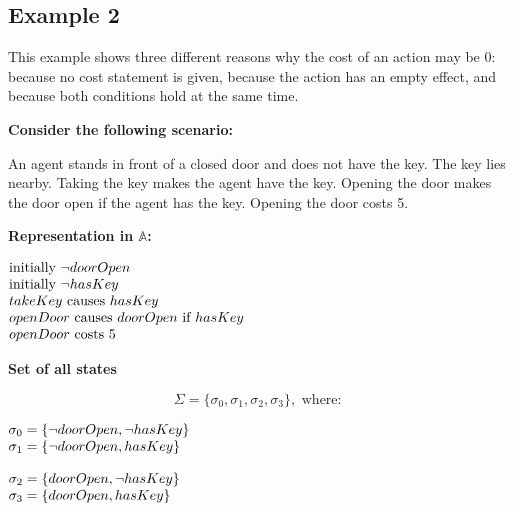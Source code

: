 \documentclass[11pt]{article}
\makeatletter
\newcommand{\states}{\Sigma}
\newcommand{\scenarioheader}{\par\noindent\textbf{Consider the following scenario:}\par}
\newcommand{\repheader}{\par\noindent\textbf{Representation in \(\mathbb{A}\):}\par}
\newcommand{\exampleblocktitle}[1]{\par\medskip\noindent\textbf{#1}\par\smallskip}
\newenvironment{centeredleftblock}[1][0.78\textwidth]
{\begin{center}\begin{minipage}{#1}\raggedright}
{\end{minipage}\end{center}}
\newenvironment{statementblock}
{\begin{flushleft}\renewcommand{\arraystretch}{1.1}\(\begin{array}{@{}l@{}}}
{\end{array}\)\end{flushleft}}
\makeatother
\begin{document}
\subsection*{Example 2}
This example shows three different reasons why the cost of an action may be
\(0\): because no cost statement is given, because the action has an empty
effect, and because both conditions hold at the same time.

\scenarioheader
An agent stands in front of a closed door and does not have the key. The key
lies nearby. Taking the key makes the agent have the key. Opening the door
makes the door open if the agent has the key. Opening the door costs 5.
\repheader
\begin{centeredleftblock}[0.62\textwidth]
\begin{statementblock}
\text{initially}~ \neg doorOpen \\
\text{initially}~ \neg hasKey \\
takeKey ~\text{causes}~ hasKey \\
openDoor ~\text{causes}~ doorOpen ~\text{if}~ hasKey \\
openDoor ~\text{costs}~ 5
\end{statementblock}
\end{centeredleftblock}


\exampleblocktitle{Set of all states}
\[
\states = \{\sigma_0, \sigma_1, \sigma_2, \sigma_3\},\text{ where: }
\]
\noindent
\begin{minipage}[t]{0.47\textwidth}
\begin{statementblock}
\sigma_0 = \{\neg doorOpen, \neg hasKey\} \\
\sigma_1 = \{\neg doorOpen, hasKey\}
\end{statementblock}
\end{minipage}
\hfill
\begin{minipage}[t]{0.47\textwidth}
\begin{statementblock}
\sigma_2 = \{doorOpen, \neg hasKey\} \\
\sigma_3 = \{doorOpen, hasKey\}
\end{statementblock}
\end{minipage}
\end{document}
